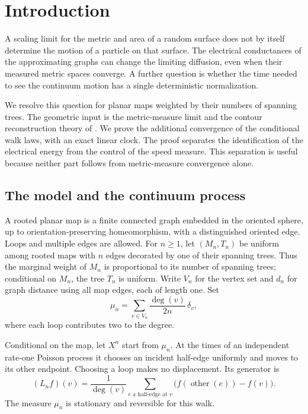 \section{Introduction}\label{sec:introduction}

A scaling limit for the metric and area of a random surface does not by
itself determine the motion of a particle on that surface. The electrical
conductances of the approximating graphs can change the limiting
diffusion, even when their measured metric spaces converge. A further
question is whether the time needed to see the continuum motion has a
single deterministic normalization.

We resolve this question for planar maps weighted by their numbers of
spanning trees. The geometric input is the metric-measure limit and the
contour reconstruction theory of \cite{MetricMaps}. We prove the additional
convergence of the conditional walk laws, with an exact linear clock.
The proof separates the identification of the electrical energy from the
control of the speed measure. This separation is useful because neither
part follows from metric-measure convergence alone.

\subsection{The model and the continuum process}

A rooted planar map is a finite connected graph embedded in the oriented
sphere, up to orientation-preserving homeomorphism, with a distinguished
oriented edge. Loops and multiple edges are allowed. For $n\ge1$, let
$(M_n,T_n)$ be uniform among rooted maps with $n$ edges decorated by one
of their spanning trees. Thus the marginal weight of $M_n$ is proportional
to its number of spanning trees; conditional on $M_n$, the tree $T_n$ is
uniform. Write $V_n$ for the vertex set and $d_n$ for graph distance using
all map edges, each of length one. Set
\begin{equation}\label{eq:degree-measure}
 \mu_n=\sum_{v\in V_n}\frac{\deg(v)}{2n}\,\delta_v,
\end{equation}
where each loop contributes two to the degree.

Conditional on the map, let $X^n$ start from $\mu_n$. At the times of an
independent rate-one Poisson process it chooses an incident half-edge
uniformly and moves to its other endpoint. Choosing a loop makes no
displacement. Its generator is
\begin{equation}\label{eq:walk-generator}
 (L_nf)(v)=\frac1{\deg(v)}
   \sum_{e\text{ a half-edge at }v}
       \bigl(f(\operatorname{other}(e))-f(v)\bigr).
\end{equation}
The measure $\mu_n$ is stationary and reversible for this walk.

